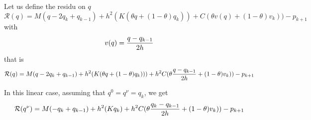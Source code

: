 Let us define the residu on $q$
\begin{equation}
  \label{eq:residu-linq}
  \mathcal R(q) =   M(q-2q_{k}+q_{k-1})  + h^2 (K(\theta q+ (1-\theta) q_k))+ C (\theta v(q)+ (1-\theta) v_k))  -  p_{k+1}
\end{equation}
with
\begin{equation}
  \label{eq:residu-linq1}
  v(q) = \displaystyle \frac{q-q_{k-1}}{2h}
\end{equation}
that is
\begin{equation}
  \label{eq:residu-linq2}
  \mathcal R(q) =   M(q-2q_{k}+q_{k-1})  + h^2 (K(\theta q+ (1-\theta) q_k)))+  h^2 C (\theta \displaystyle \frac{q-q_{k-1}}{2h}+ (1-\theta) v_k))  -  p_{k+1}
\end{equation}

In this linear case, assuming that $q^0=q^\nu = q_k$, we get
\begin{equation}
  \label{eq:residu-linq2}
  \mathcal R(q^\nu) =   M(-q_{k}+q_{k-1})  + h^2 (K q_k)+  h^2 C (\theta \displaystyle \frac{q_k-q_{k-1}}{2h}+ (1-\theta) v_k))  -  p_{k+1}
\end{equation}


